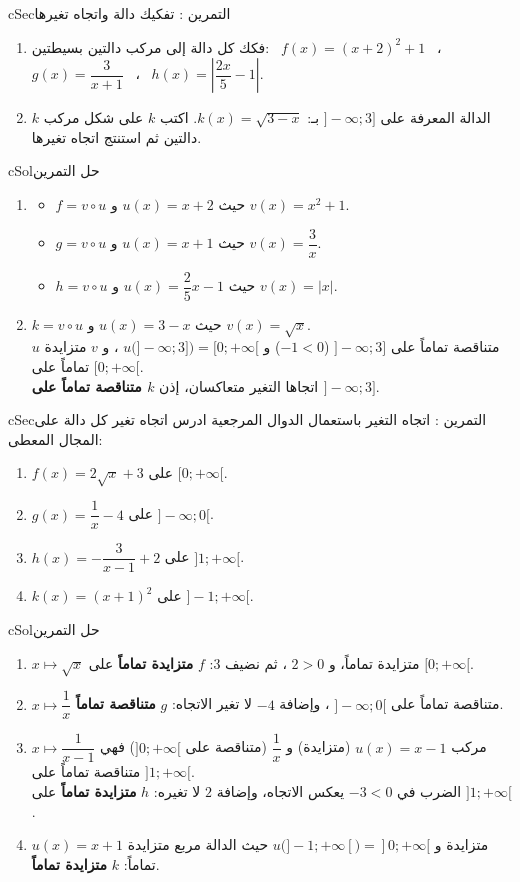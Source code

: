 \documentclass[12pt,a4paper]{article}
\newenvironment{BOX}[2]{\begin{otherlanguage}{english}\begin{arbox}{#1}{#2}}{\end{arbox}\end{otherlanguage}}
\newcounter{exo}
\newenvironment{tamrin}[1]{\stepcounter{exo}\begin{BOX}{cSec}{التمرين \theexo: #1}}{\end{BOX}}
\newenvironment{hal}{\Needspace{12\baselineskip}\begin{otherlanguage}{english}\begin{arbox}[breakable]{cSol}{حل التمرين \theexo}}{\end{arbox}\end{otherlanguage}}
\begin{document}
\begin{tamrin}{تفكيك دالة واتجاه تغيرها}
\begin{enumerate}
\item فكك كل دالة إلى مركب دالتين بسيطتين: \ $f(x)=(x+2)^2+1$ \ ، \ $g(x)=\dfrac{3}{x+1}$ \ ، \ $h(x)=\left|\dfrac{2x}{5}-1\right|$.
\item $k$ الدالة المعرفة على $]-\infty;3]$ بـ: $k(x)=\sqrt{3-x}$. اكتب $k$ على شكل مركب دالتين ثم استنتج اتجاه تغيرها.
\end{enumerate}
\end{tamrin}
\begin{hal}
\begin{enumerate}
\item \begin{itemize}
\item $f=v\circ u$ حيث $u(x)=x+2$ و $v(x)=x^2+1$.
\item $g=v\circ u$ حيث $u(x)=x+1$ و $v(x)=\dfrac3x$.
\item $h=v\circ u$ حيث $u(x)=\dfrac25x-1$ و $v(x)=|x|$.
\end{itemize}
\item $k=v\circ u$ حيث $u(x)=3-x$ و $v(x)=\sqrt x$.\\
$u$ متناقصة تماماً على $]-\infty;3]$ ($-1<0$) و $u\big(]-\infty;3]\big)=[0;+\infty[$ ، و $v$ متزايدة تماماً على $[0;+\infty[$.\\
اتجاها التغير متعاكسان، إذن \textbf{$k$ متناقصة تماماً على $]-\infty;3]$}.
\end{enumerate}
\end{hal}

\begin{tamrin}{اتجاه التغير باستعمال الدوال المرجعية}
ادرس اتجاه تغير كل دالة على المجال المعطى:
\begin{enumerate}
\item $f(x)=2\sqrt x+3$ على $[0;+\infty[$.
\item $g(x)=\dfrac1x-4$ على $]-\infty;0[$.
\item $h(x)=-\dfrac{3}{x-1}+2$ على $]1;+\infty[$.
\item $k(x)=(x+1)^2$ على $]-1;+\infty[$.
\end{enumerate}
\end{tamrin}
\begin{hal}
\begin{enumerate}
\item $x\mapsto\sqrt x$ متزايدة تماماً، و $2>0$ ، ثم نضيف $3$: $f$ \textbf{متزايدة تماماً} على $[0;+\infty[$.
\item $x\mapsto\dfrac1x$ متناقصة تماماً على $]-\infty;0[$ ، وإضافة $-4$ لا تغير الاتجاه: $g$ \textbf{متناقصة تماماً}.
\item $x\mapsto\dfrac1{x-1}$ مركب $u(x)=x-1$ (متزايدة) و $\dfrac1x$ (متناقصة على $]0;+\infty[$) فهي متناقصة تماماً على $]1;+\infty[$.\\
الضرب في $-3<0$ يعكس الاتجاه، وإضافة $2$ لا تغيره: $h$ \textbf{متزايدة تماماً} على $]1;+\infty[$.
\item $u(x)=x+1$ متزايدة و $u\big(]-1;+\infty[\big)=]0;+\infty[$ حيث الدالة مربع متزايدة تماماً: $k$ \textbf{متزايدة تماماً}.
\end{enumerate}
\end{hal}
\end{document}
